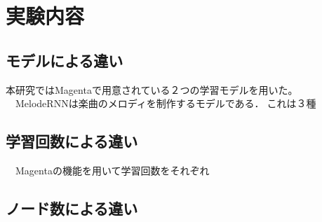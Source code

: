\chapter{実験内容}
\section{モデルによる違い}
本研究ではMagentaで用意されている２つの学習モデルを用いた。
　MelodeRNNは楽曲のメロディを制作するモデルである．これは３種
\section{学習回数による違い}

　Magentaの機能を用いて学習回数をそれぞれ
\section{ノード数による違い}


